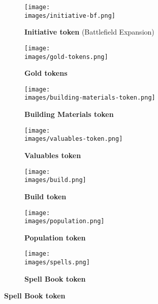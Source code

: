 \begin{figure}[H]
  \centering
  \begin{subfigure}[b]{0.16\linewidth}
    \centering
    \texttt{[image: \\images/initiative-bf.png]}
    \caption{\textbf{Initiative token} (Battlefield Expansion)}
  \end{subfigure}
  \begin{subfigure}[b]{0.18\linewidth}
    \centering
    \texttt{[image: \\images/gold-tokens.png]}
    \caption{\textbf{Gold tokens} \phantom{Population} \phantom{Population} \phantom{Population}}
  \end{subfigure}
  \begin{subfigure}[b]{0.12\linewidth}
    \centering
    \texttt{[image: \\images/building-materials-token.png]}
    \caption{\textbf{Building Materials token} \phantom{Population}}
  \end{subfigure}
  \begin{subfigure}[b]{0.12\linewidth}
    \centering
    \texttt{[image: \\images/valuables-token.png]}
    \caption{\textbf{Valuables token} \phantom{Population} \phantom{Population}}
  \end{subfigure}
  \begin{subfigure}[b]{0.12\linewidth}
    \centering
    \texttt{[image: \\images/build.png]}
    \caption{\textbf{Build token} \phantom{Population} \phantom{Population}}
  \end{subfigure}
  \begin{subfigure}[b]{0.13\linewidth}
    \centering
    \texttt{[image: \\images/population.png]}
    \caption{\textbf{Population token} \phantom{Population} \phantom{Population}}
  \end{subfigure}
  \begin{subfigure}[b]{0.12\linewidth}
    \centering
    \texttt{[image: \\images/spells.png]}
    \caption{\textbf{Spell Book token} \phantom{Population}}
  \end{subfigure}
\end{figure}
\vspace*{-4em}
